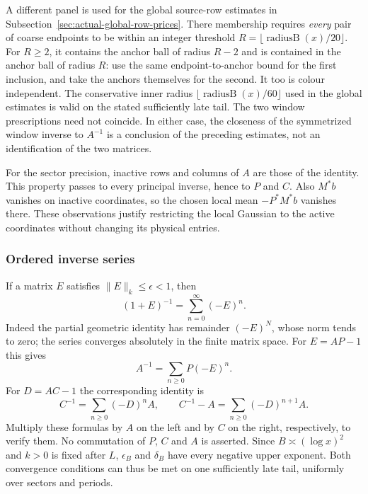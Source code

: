 A different panel is used for the global source-row estimates in
Subsection~\ref{sec:actual-global-row-prices}. There membership requires
\emph{every} pair of coarse endpoints to be within an integer threshold
$R=\lfloor\operatorname{radiusB}(x)/20\rfloor$. For $R\geq2$, it contains
the anchor ball of radius $R-2$ and is contained in the anchor ball of
radius $R$: use the same endpoint-to-anchor bound for the first inclusion,
and take the anchors themselves for the second. It too is colour independent.
The conservative inner radius $\lfloor\operatorname{radiusB}(x)/60\rfloor$
used in the global estimates is valid on the stated sufficiently late tail.
The two window prescriptions need not coincide. In either case, the
closeness of the symmetrized window inverse to $A^{-1}$ is a conclusion
of the preceding estimates, not an identification of the two matrices.

For the sector precision, inactive rows and columns of $A$ are
those of the identity. This property passes to every principal
inverse, hence to $P$ and $C$. Also $M^*b$ vanishes on inactive
coordinates, so the chosen local mean $-P^*M^*b$ vanishes there.
These observations justify restricting the local Gaussian to the
active coordinates without changing its physical entries.

\subsubsection{Ordered inverse series}
If a matrix $E$ satisfies $\|E\|_k\le\epsilon<1$, then
\[
 (1+E)^{-1}=\sum_{n=0}^\infty(-E)^n.
\]
Indeed the partial geometric identity has remainder $(-E)^N$,
whose norm tends to zero; the series converges absolutely in the
finite matrix space. For $E=AP-1$ this gives
\begin{equation}\label{eq:local-inverse-series}
 A^{-1}=\sum_{n\ge0}P(-E)^n.
\end{equation}
For $D=AC-1$ the corresponding identity is
\begin{equation}\label{eq:covariance-inverse-series}
 C^{-1}=\sum_{n\ge0}(-D)^nA,
 \qquad C^{-1}-A=\sum_{n\ge0}(-D)^{n+1}A.
\end{equation}
Multiply these formulas by $A$ on the left and by $C$ on the
right, respectively, to verify them. No commutation of $P$, $C$
and $A$ is asserted. Since $B\asymp(\log x)^2$ and $k>0$ is
fixed after $L$, $\epsilon_B$ and $\delta_B$ have every negative
upper exponent. Both convergence conditions can thus be met on
one sufficiently late tail, uniformly over sectors and periods.

